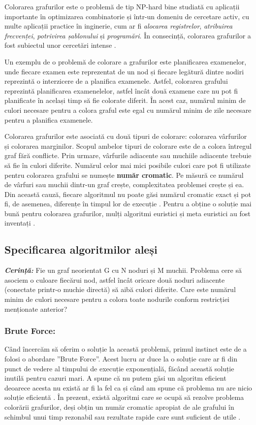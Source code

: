 \documentclass[runningheads]{llncs}
\begin{document}
Colorarea grafurilor este o problemă de tip NP-hard bine studiată cu aplicații 
importante în optimizarea combinatorie și într-un domeniu de cercetare activ, cu 
multe aplicații practice \cite{4} în inginerie, cum ar fi \textit{alocarea registrelor}, 
\textit{atribuirea frecvenței}, \textit{potrivirea șablonului} și \textit{programări}. 
În consecință, colorarea grafurilor a fost subiectul unor cercetări intense \cite{5} \cite{2}.

Un exemplu de o problemă de colorare a grafurilor este planificarea examenelor, unde
fiecare examen este reprezentat de un nod și fiecare legătură dintre nodiri reprezintă
o interzicere de a planifica examenele. Astfel, colorarea grafului reprezintă planificarea
examenelelor, astfel încât două examene care nu pot fi planificate în același timp să fie
colorate diferit. În acest caz, numărul minim de culori necesare pentru a colora graful
este egal cu numărul minim de zile necesare pentru a planifica examenele. \cite{6}

Colorarea grafurilor este asociată cu două tipuri de colorare: colorarea vârfurilor 
și colorarea marginilor. Scopul ambelor tipuri de colorare este de a colora întregul graf fără
conflicte. Prin urmare, vârfurile adiacente sau muchiile adiacente trebuie
să fie în culori diferite. Numărul celor mai mici
posibile culori care pot fi utilizate pentru colorarea grafului se numește 
\textbf{număr cromatic}.
Pe măsură ce numărul de vârfuri sau muchii dintr-un graf crește,
complexitatea problemei crește și ea. Din această cauză, fiecare
algoritmul nu poate găsi numărul cromatic exact  
și pot fi, de asemenea, diferențe în timpul lor de execuție \cite{7}. Pentru a obține 
o soluție mai bună pentru colorarea grafurilor, mulți algoritmi euristici și meta
euristici au fost inventați \cite{8}.
% 
\subsection{Specificarea algoritmilor aleși}

\textbf{\textit{Cerință:}} Fie un graf neorientat G cu N noduri și M muchii. Problema cere să asociem o culoare 
fiecărui nod, astfel încât oricare două noduri adiacente (conectate printr-o muchie directă) 
să aibă culori diferite. Care este numărul minim de culori necesare pentru a colora 
toate nodurile conform restricției menționate anterior? \cite{9}

\subsubsection{Brute Force:}
Când încercăm să oferim o soluție la această problemă, primul instinct este de a
folosi o abordare ”Brute Force”. Acest lucru ar duce la o soluție care ar fi 
din punct de vedere al timpului de execuție exponențială, făcând această soluție 
inutilă pentru cazuri mari. A spune că nu putem găsi un algoritm eficient 
deoarece acesta nu există ar fi la fel ca și când am spune că problema nu are 
nicio soluție eficientă \cite{10}.
În prezent, există algoritmi care se ocupă să rezolve problema colorării grafurilor, 
deși obțin un număr cromatic apropiat de ale grafului în schimbul unui timp
rezonabil sau rezultate rapide care sunt suficient de utile \cite{11}.
\end{document}
